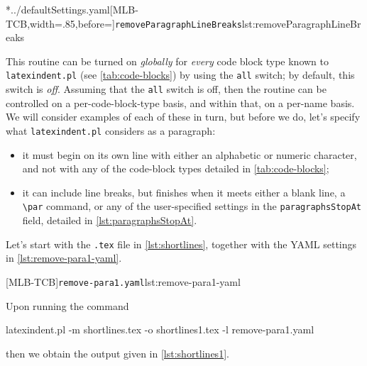 	\cmhlistingsfromfile[style=removeParagraphLineBreaks]*{../defaultSettings.yaml}[MLB-TCB,width=.85\linewidth,before=\centering]{\texttt{removeParagraphLineBreaks}}{lst:removeParagraphLineBreaks}

	This routine can be turned on \emph{globally} for \emph{every} code block type known to \texttt{latexindent.pl}
	(see \vref{tab:code-blocks}) by using the \texttt{all} switch; by default, this switch is \emph{off}. Assuming
	that the \texttt{all} switch is off, then the routine can be controlled on a per-code-block-type basis, and
	within that, on a per-name basis. We will consider examples of each of these in turn, but
	before we do, let's specify what \texttt{latexindent.pl} considers as a paragraph:
	\begin{itemize}
		\item it must begin on its own line with either an alphabetic or numeric character, and not with any of the
		      code-block types detailed in \vref{tab:code-blocks};
		\item it can include line breaks, but finishes when it meets either a blank line, a \lstinline!\par!
		      command, or any of the user-specified settings in the \texttt{paragraphsStopAt} field,
		      detailed in \vref{lst:paragraphsStopAt}.
	\end{itemize}

	Let's start with the \texttt{.tex} file in \cref{lst:shortlines}, together with the YAML settings in
	\cref{lst:remove-para1-yaml}.

	\begin{minipage}{.45\linewidth}
	\end{minipage}
	\hfill
	\begin{minipage}{.49\linewidth}
		[MLB-TCB]{\texttt{remove-para1.yaml}}{lst:remove-para1-yaml}
	\end{minipage}

	Upon running the command
	\begin{commandshell}
latexindent.pl -m shortlines.tex -o shortlines1.tex -l remove-para1.yaml
\end{commandshell}
	then we obtain the output given in \cref{lst:shortlines1}.


